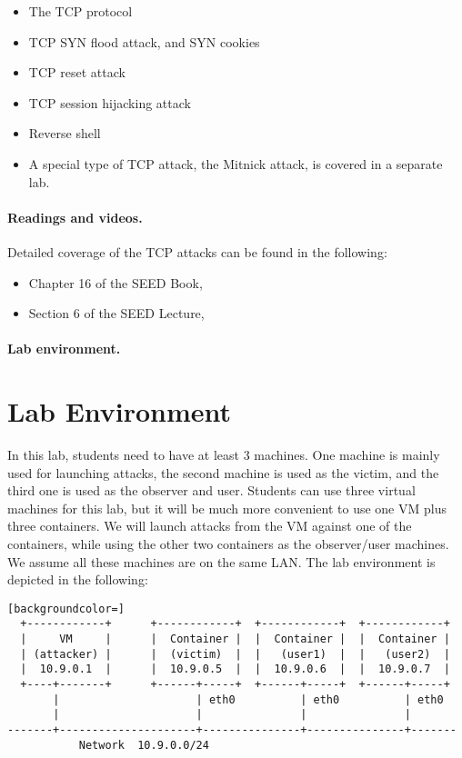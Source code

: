 \begin{itemize}[noitemsep]
\item The TCP protocol
\item TCP SYN flood attack, and SYN cookies 
\item TCP reset attack
\item TCP session hijacking attack
\item Reverse shell 
\item A special type of TCP attack, the Mitnick attack, is covered 
in a separate lab. 
\end{itemize}


\paragraph{Readings and videos.}
Detailed coverage of the TCP attacks can be found in the following:

\begin{itemize}
\item Chapter 16 of the SEED Book, \seedbook
\item Section 6 of the SEED Lecture, \seedisvideo
\end{itemize}


\paragraph{Lab environment.} \seedenvironmentB



\section{Lab Environment}


In this lab, students need to have at least 3 machines. One machine 
is mainly used for launching attacks, the second machine is used as the victim, and 
the third one is used as the observer and user. Students can use three virtual 
machines for this lab, but it will be much more convenient to 
use one VM plus three containers. We will launch 
attacks from the VM against one of the containers, while using
the other two containers as the observer/user machines.
We assume all these machines are on the same LAN. 
The lab environment is depicted in the following:


\begin{lstlisting}[backgroundcolor=]
  +------------+      +------------+  +------------+  +------------+
  |     VM     |      |  Container |  |  Container |  |  Container |
  | (attacker) |      |  (victim)  |  |   (user1)  |  |   (user2)  |
  |  10.9.0.1  |      |  10.9.0.5  |  |  10.9.0.6  |  |  10.9.0.7  |
  +----+-------+      +------+-----+  +------+-----+  +------+-----+
       |                     | eth0          | eth0          | eth0
       |                     |               |               |
-------+---------------------+---------------+---------------+-------
           Network  10.9.0.0/24

\end{lstlisting}
 

